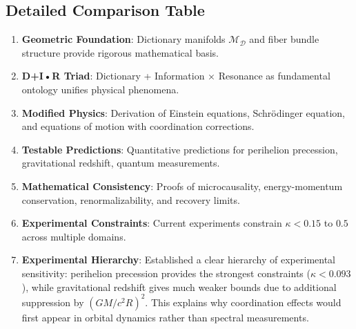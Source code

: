 \documentclass[11pt,a4paper]{article}
\begin{document}
	\subsection{Detailed Comparison Table}
	\begin{enumerate}
		\item \textbf{Geometric Foundation}: Dictionary manifolds $\mathcal{M}_{\mathcal{D}}$ and fiber bundle structure provide rigorous mathematical basis.
		
		\item \textbf{D+I•R Triad}: Dictionary + Information × Resonance as fundamental ontology unifies physical phenomena.
		
		\item \textbf{Modified Physics}: Derivation of Einstein equations, Schrödinger equation, and equations of motion with coordination corrections.
		
		\item \textbf{Testable Predictions}: Quantitative predictions for perihelion precession, gravitational redshift, quantum measurements.
		
		\item \textbf{Mathematical Consistency}: Proofs of microcausality, energy-momentum conservation, renormalizability, and recovery limits.
		
		\item \textbf{Experimental Constraints}: Current experiments constrain $\kappa < 0.15$ to $0.5$ across multiple domains.
		
		\item \textbf{Experimental Hierarchy}: Established a clear hierarchy of experimental sensitivity: perihelion precession provides the strongest constraints ($\kappa < 0.093$), while gravitational redshift gives much weaker bounds due to additional suppression by $(GM/c^2R)^2$. This explains why coordination effects would first appear in orbital dynamics rather than spectral measurements.
	\end{enumerate}
\end{document}
